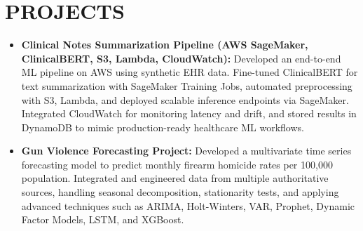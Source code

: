 \documentclass[10pt,letter]{article}
\newcommand{\boldlarger}[1]{\textbf{\normalsize #1}}
\begin{document}


\section*{PROJECTS}
\begin{itemize}

    \item \boldlarger{Clinical Notes Summarization Pipeline (AWS SageMaker, ClinicalBERT, S3, Lambda, CloudWatch):} Developed an end-to-end ML pipeline on AWS using synthetic EHR data. Fine-tuned ClinicalBERT for text summarization with SageMaker Training Jobs, automated preprocessing with S3, Lambda, and deployed scalable inference endpoints via SageMaker. Integrated CloudWatch for monitoring latency and drift, and stored results in DynamoDB to mimic production-ready healthcare ML workflows.

    \item \boldlarger{Gun Violence Forecasting Project:} Developed a multivariate time series forecasting model to predict monthly firearm homicide rates per 100,000 population. Integrated and engineered data from multiple authoritative sources, handling seasonal decomposition, stationarity tests, and applying advanced techniques such as ARIMA, Holt-Winters, VAR, Prophet, Dynamic Factor Models, LSTM, and XGBoost.
  
\end{itemize}
 \vspace{-4pt}
\end{document}
